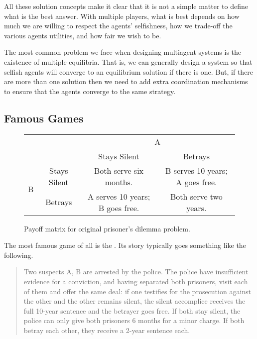 \medskip

All these solution concepts make it clear that it is not a simple
matter to define what is the best answer. With multiple players, what
is best depends on how much we are willing to respect the agents'
selfishness, how we trade-off the various agents utilities, and how
fair we wish to be.

The most common problem we face when designing multiagent systems is
the existence of multiple equilibria. That is, we can generally design
a system so that selfish agents will converge to an equilibrium
solution if there is one. But, if there are more than one solution
then we need to add extra coordination mechanisms to ensure that the
agents converge to the same strategy.

\subsection{Famous Games}

\begin{SCfigure}
  \begin{minipage}{1.0\linewidth}
    \begin{center}
    \renewcommand\arraystretch{1.5}
  \begin{tabular}{cc|c|c|}
&    &\multicolumn{2}{c}{A} \\ 
&      &Stays Silent&Betrays \\ \cline{1-4}
\multirow{2}{2em}{B}
& Stays Silent  &\parbox{8em}{\raggedright \vspace{1em}Both serve six months.\vspace{1em}}&\parbox{8em}{\raggedright B serves 10 years; A goes free.} \\ 
& Betrays  &\parbox{8em}{\raggedright \vspace{1em}A serves 10 years; B goes free.\vspace{1em}}&\parbox{8em}{\raggedright Both serve two years.} \\ 
\end{tabular}
    \end{center}
  \end{minipage}
  \caption{Payoff matrix for original prisoner's dilemma problem.}
  \label{fig:orig-pd}
\end{SCfigure}

The most famous game of all is the . Its story
typically goes something like the following.
\begin{quotation}
    Two suspects A, B are arrested by the police. The police have
    insufficient evidence for a conviction, and having separated both
    prisoners, visit each of them and offer the same deal: if one
    testifies for the prosecution against the other and the other
    remains silent, the silent accomplice receives the full 10-year
    sentence and the betrayer goes free. If both stay silent, the
    police can only give both prisoners 6 months for a minor charge.
    If both betray each other, they receive a 2-year sentence each.
\end{quotation}

